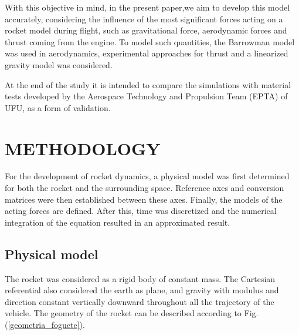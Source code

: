 \documentclass[10pt,fleqn,a4paper,twoside]{article}
\begin{document}
With this objective in mind, in the present paper,we aim to develop this model accurately, considering the influence of the most significant forces acting on a rocket model during flight, such as gravitational force, aerodynamic forces and thrust coming from the engine. To model such quantities, the Barrowman model was used in aerodynamics, experimental approaches for thrust and a linearized gravity model was considered.



At the end of the study it is intended to compare the simulations with material tests developed by the Aerospace Technology and Propulsion Team (EPTA) of UFU, as a form of validation.

\section{METHODOLOGY}

For the development of rocket dynamics, a physical model was first determined for both the rocket and the surrounding space. Reference axes and conversion matrices were then established between these axes. Finally, the models of the acting forces are defined. After this, time was discretized and the numerical integration of the equation resulted in an approximated result.

\subsection{Physical model}

The rocket was considered as a rigid body of constant mass. The Cartesian referential also considered the earth as plane, and gravity with modulus and direction constant vertically downward throughout all the trajectory of the vehicle. The geometry of the rocket can be described according to Fig. (\ref{geometria_foguete}).
\end{document}
